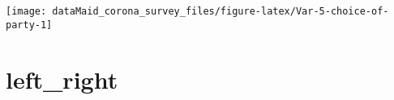 \documentclass[
]{report}
\begin{document}
\begin{minipage}{0.25 \textwidth}

\begin{center}\texttt{[image: dataMaid\_corona\_survey\_files/figure-latex/Var-5-choice-of-party-1]} \end{center}

\end{minipage}

\noindent\makebox[\linewidth]{\rule{\textwidth}{0.4pt}}

\hypertarget{left_right}{%
\section{left\_right}\label{left_right}}

\begin{minipage}{0.75 \textwidth}


\end{minipage}
\end{document}
